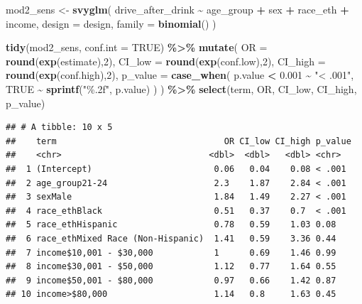 \documentclass[
]{article}
\newenvironment{Shaded}{\begin{snugshade}}{\end{snugshade}}
\newcommand{\AttributeTok}[1]{\textcolor[rgb]{0.13,0.29,0.53}{#1}}
\newcommand{\ConstantTok}[1]{\textcolor[rgb]{0.56,0.35,0.01}{#1}}
\newcommand{\DecValTok}[1]{\textcolor[rgb]{0.00,0.00,0.81}{#1}}
\newcommand{\FloatTok}[1]{\textcolor[rgb]{0.00,0.00,0.81}{#1}}
\newcommand{\FunctionTok}[1]{\textcolor[rgb]{0.13,0.29,0.53}{\textbf{#1}}}
\newcommand{\NormalTok}[1]{#1}
\newcommand{\OtherTok}[1]{\textcolor[rgb]{0.56,0.35,0.01}{#1}}
\newcommand{\SpecialCharTok}[1]{\textcolor[rgb]{0.81,0.36,0.00}{\textbf{#1}}}
\newcommand{\StringTok}[1]{\textcolor[rgb]{0.31,0.60,0.02}{#1}}
\begin{document}
\begin{Shaded}
\begin{Highlighting}[]
\NormalTok{mod2\_sens }\OtherTok{\textless{}{-}} \FunctionTok{svyglm}\NormalTok{(}
\NormalTok{  drive\_after\_drink }\SpecialCharTok{\textasciitilde{}}\NormalTok{ age\_group }\SpecialCharTok{+}\NormalTok{ sex }\SpecialCharTok{+}\NormalTok{ race\_eth }\SpecialCharTok{+}\NormalTok{ income,}
  \AttributeTok{design =}\NormalTok{ design,}
  \AttributeTok{family =} \FunctionTok{binomial}\NormalTok{()}
\NormalTok{) }

\FunctionTok{tidy}\NormalTok{(mod2\_sens, }\AttributeTok{conf.int =} \ConstantTok{TRUE}\NormalTok{) }\SpecialCharTok{\%\textgreater{}\%}
  \FunctionTok{mutate}\NormalTok{(}
    \AttributeTok{OR =} \FunctionTok{round}\NormalTok{(}\FunctionTok{exp}\NormalTok{(estimate),}\DecValTok{2}\NormalTok{),}
    \AttributeTok{CI\_low =} \FunctionTok{round}\NormalTok{(}\FunctionTok{exp}\NormalTok{(conf.low),}\DecValTok{2}\NormalTok{),}
    \AttributeTok{CI\_high =} \FunctionTok{round}\NormalTok{(}\FunctionTok{exp}\NormalTok{(conf.high),}\DecValTok{2}\NormalTok{),}
    \AttributeTok{p\_value =} \FunctionTok{case\_when}\NormalTok{(}
\NormalTok{      p.value }\SpecialCharTok{\textless{}} \FloatTok{0.001} \SpecialCharTok{\textasciitilde{}} \StringTok{"\textless{} .001"}\NormalTok{,}
      \ConstantTok{TRUE} \SpecialCharTok{\textasciitilde{}} \FunctionTok{sprintf}\NormalTok{(}\StringTok{"\%.2f"}\NormalTok{, p.value)}
\NormalTok{    )}
\NormalTok{  ) }\SpecialCharTok{\%\textgreater{}\%}
  \FunctionTok{select}\NormalTok{(term, OR, CI\_low, CI\_high, p\_value)}
\end{Highlighting}
\end{Shaded}

\begin{verbatim}
## # A tibble: 10 x 5
##    term                                 OR CI_low CI_high p_value
##    <chr>                             <dbl>  <dbl>   <dbl> <chr>  
##  1 (Intercept)                        0.06   0.04    0.08 < .001 
##  2 age_group21-24                     2.3    1.87    2.84 < .001 
##  3 sexMale                            1.84   1.49    2.27 < .001 
##  4 race_ethBlack                      0.51   0.37    0.7  < .001 
##  5 race_ethHispanic                   0.78   0.59    1.03 0.08   
##  6 race_ethMixed Race (Non-Hispanic)  1.41   0.59    3.36 0.44   
##  7 income$10,001 - $30,000            1      0.69    1.46 0.99   
##  8 income$30,001 - $50,000            1.12   0.77    1.64 0.55   
##  9 income$50,001 - $80,000            0.97   0.66    1.42 0.87   
## 10 income>$80,000                     1.14   0.8     1.63 0.45
\end{verbatim}
\end{document}
